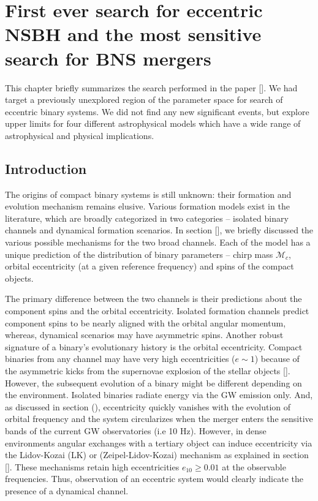 \chapter{First ever search for eccentric NSBH and the most sensitive search for BNS mergers}

This chapter briefly summarizes the search performed in the paper []. We had target a previously unexplored region of the parameter space for search of eccentric binary systems. We did not find any new significant events, but explore upper limits for four different astrophysical models which have a wide range of astrophysical and physical implications.  

\section{Introduction}

The origins of compact binary systems is still unknown: their formation and evolution mechanism remains elusive. Various formation models exist in the literature, which are broadly categorized in two categories -- isolated binary channels and dynamical formation scenarios. In section [], we briefly discussed the various possible mechanisms for the two broad channels. Each of the model has a unique prediction of the distribution of binary parameters -- chirp mass $\mathcal{M}_c$, orbital eccentricity (at a given reference frequency) and spins of the compact objects. 

The primary difference between the two channels is their predictions about the component spins and the orbital eccentricity. Isolated formation channels predict component spins to be nearly aligned with the orbital angular momentum, whereas, dynamical scenarios may have asymmetric spins. Another robust signature of a binary's evolutionary history is the orbital eccentricity. Compact binaries from any channel may have very high eccentricities ($e \sim 1$) because of the asymmetric kicks from the supernovae explosion of the stellar objects []. However, the subsequent evolution of a binary might be different depending on the environment. Isolated binaries radiate energy via the GW emission only. And, as discussed in section (), eccentricity quickly vanishes with the evolution of orbital frequency and the system circularizes when the merger enters the sensitive bands of the current GW observatories (i.e 10 Hz). However, in dense environments angular exchanges with a tertiary object can induce eccentricity via the Lidov-Kozai (LK) or (Zeipel-Lidov-Kozai) mechanism as explained in section []. These mechanisms retain high eccentricities $e_{10} \geq 0.01$ at the observable frequencies. Thus, observation of an eccentric system would clearly indicate the presence of a dynamical channel.

